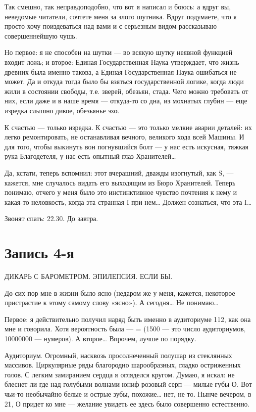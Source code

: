 \documentclass[11pt,openany]{book}
\newcommand{\bookchapterplain}[1]{%
  \clearpage\phantomsection\chapter*{#1}%
  \addcontentsline{toc}{chapter}{#1}\markboth{#1}{#1}\thispagestyle{plain}}
\begin{document}
Так смешно, так неправдоподобно, что вот я написал и боюсь: а вдруг вы, неведомые читатели, сочтете меня за злого шутника. Вдруг подумаете, что я просто хочу поиздеваться над вами и с серьезным видом рассказываю совершеннейшую чушь.

Но первое: я не способен на шутки --- во всякую шутку неявной функцией входит ложь; и второе: Единая Государственная Наука утверждает, что жизнь древних была именно такова, а Единая Государственная Наука ошибаться не может. Да и откуда тогда было бы взяться государственной логике, когда люди жили в состоянии свободы, т.е. зверей, обезьян, стада. Чего можно требовать от них, если даже и в наше время --- откуда-то со дна, из мохнатых глубин --- еще изредка слышно дикое, обезьянье эхо.

К счастью --- только изредка. К счастью --- это только мелкие аварии деталей: их легко ремонтировать, не останавливая вечного, великого хода всей Машины. И для того, чтобы выкинуть вон погнувшийся болт --- у нас есть искусная, тяжкая рука Благодетеля, у нас есть опытный глаз Хранителей\ldots{}

Да, кстати, теперь вспомнил: этот вчерашний, дважды изогнутый, как S, --- кажется, мне случалось видать его выходящим из Бюро Хранителей. Теперь понимаю, отчего у меня было это инстинктивное чувство почтения к нему и какая-то неловкость, когда эта странная I при нем\ldots{} Должен сознаться, что эта I\ldots{}

Звонят спать: 22.30. До завтра.

\bookchapterplain{Запись 4-я}

\begin{center}\textsc{ДИКАРЬ С БАРОМЕТРОМ. ЭПИЛЕПСИЯ. ЕСЛИ БЫ.}\end{center}

До сих пор мне в жизни было ясно (недаром же у меня, кажется, некоторое пристрастие к этому самому слову «ясно»). А сегодня\ldots{} Не понимаю\ldots{}

Первое: я действительно получил наряд быть именно в аудиториуме 112, как она мне и говорила. Хотя вероятность была --- = (1500 --- это число аудиториумов, 10000000 --- нумеров). А второе\ldots{} Впрочем, лучше по порядку.

Аудиториум. Огромный, насквозь просолнеченный полушар из стеклянных массивов. Циркулярные ряды благородно шарообразных, гладко остриженных голов. С легким замиранием сердца я огляделся кругом. Думаю, я искал: не блеснет ли где над голубыми волнами юниф розовый серп --- милые губы О. Вот чьи-то необычайно белые и острые зубы, похожие\ldots{} нет, не то. Нынче вечером, в 21, О придет ко мне --- желание увидеть ее здесь было совершенно естественно.
\end{document}

